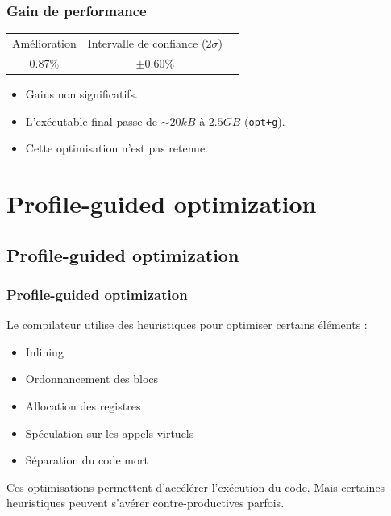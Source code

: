 \documentclass{beamer}
\begin{document}
\begin{frame}[fragile]
    \frametitle{Gain de performance}

    \begin{center}
        \begin{tabular}{ c c c }
            Amélioration & Intervalle de confiance ($2\sigma$) \\
            $0.87\%$     & $\pm 0.60\%$
        \end{tabular}
    \end{center}

    \begin{itemize}
        \item Gains non significatifs.
        \item L'exécutable final passe de $ \sim 20 kB $ à $ 2.5 GB $ (\verb'opt+g').
        \item Cette optimisation n'est pas retenue.
    \end{itemize}
\end{frame}

\section{Profile-guided optimization}

\begin{frame}
    \tableofcontents[currentsection]
\end{frame}

\subsection{Profile-guided optimization}

\begin{frame}
    \frametitle{Profile-guided optimization}

    Le compilateur utilise des heuristiques pour optimiser certains éléments :
    \begin{itemize}
        \item Inlining
        \item Ordonnancement des blocs
        \item Allocation des registres
        \item Spéculation sur les appels virtuels
        \item Séparation du code mort
    \end{itemize}
    Ces optimisations permettent d'accélérer l'exécution du code.
    Mais certaines heuristiques peuvent s'avérer contre-productives parfois.
\end{frame}
\end{document}
